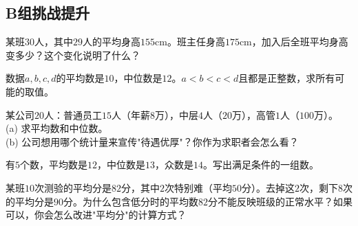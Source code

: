 \subsection*{B组\quad 挑战提升}

\begin{exercise}
\item 某班$30$人，其中$29$人的平均身高$155$cm。班主任身高$175$cm，加入后全班平均身高变多少？这个变化说明了什么？
\item 数据$a,b,c,d$的平均数是$10$，中位数是$12$。$a<b<c<d$且都是正整数，求所有可能的取值。
\item 某公司$20$人：普通员工$15$人（年薪$8$万），中层$4$人（$20$万），高管$1$人（$100$万）。\\
(a) 求平均数和中位数。\\
(b) 公司想用哪个统计量来宣传"待遇优厚"？你作为求职者会怎么看？
\item 有$5$个数，平均数是$12$，中位数是$13$，众数是$14$。写出满足条件的一组数。
\item 某班$10$次测验的平均分是$82$分，其中$2$次特别难（平均$50$分）。去掉这$2$次，剩下$8$次的平均分是$90$分。为什么包含低分时的平均数$82$分不能反映班级的正常水平？如果可以，你会怎么改进"平均分"的计算方式？
\end{exercise}

\newpage
